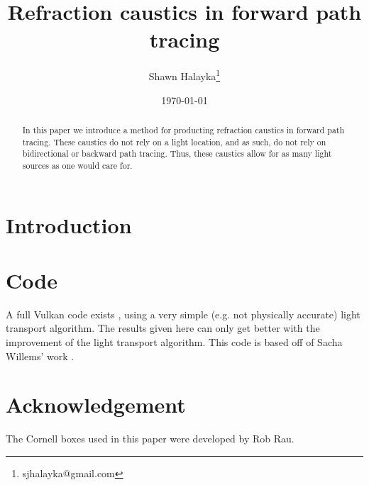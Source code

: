 \documentclass[12pt]{article}
\title{Refraction caustics in forward path tracing}
\author{
Shawn Halayka\footnote{sjhalayka@gmail.com}
}
\date{\today\;\currenttime}
\begin{document}
\newcommand{\abs}[1]{\lvert#1\rvert}



\maketitle




\begin{abstract}
In this paper we introduce a method for producting refraction caustics in forward path tracing.
These caustics do not rely on a light location, and as such, do not rely on bidirectional or backward path tracing.
Thus, these caustics allow for as many light sources as one would care for.
\end{abstract}

\section{Introduction}






\section{Code}
A full Vulkan code exists \cite{halayka}, using a very simple (e.g. not physically accurate) light transport algorithm.
The results given here can only get better with the improvement of the light transport algorithm.
This code is based off of Sacha Willems' work \cite{willems1, willems2}.



\section{Acknowledgement}

The Cornell boxes used in this paper were developed by Rob Rau.
\end{document}
